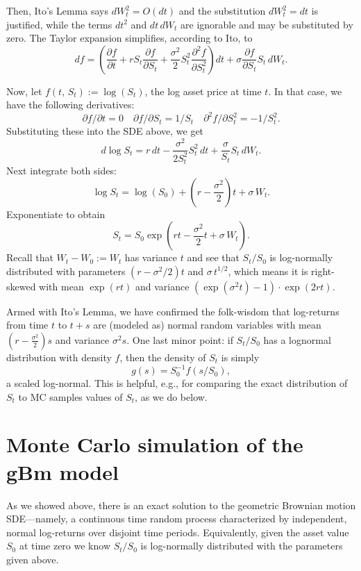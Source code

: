 \documentclass[
]{book}
\begin{document}
Then, Ito's Lemma says \(dW_t^2 = O(dt)\) and the substitution \(dW_t^2 = dt\) is justified, while the terms \(dt^2\) and \(dt\,dW_t\) are ignorable and may be substituted by zero. The Taylor expansion simplifies, according to Ito, to
\[df = \left(\frac{\partial f}{\partial t} + r S_t\frac{\partial f}{\partial S_t} +\frac{\sigma^2}{2}S_t^2\frac{\partial^2 f}{\partial S_t^2}\right)dt + \sigma\frac{\partial f}{\partial S_t}S_t \,dW_t.\]

Now, let \(f(t,\, S_t):= \log(S_t)\), the log asset price at time \(t\). In that case, we have the following derivatives:
\[\partial f/\partial t = 0\quad \partial f/\partial S_t = 1/S_t \quad \partial^2 f/\partial S_t^2 = -1/S_t^2.\]
Substituting these into the SDE above, we get
\[d\log S_t = r\,dt - \frac{\sigma^2}{2S_t^2}S_t^2\,dt + \frac{\sigma}{S_t}S_t\,dW_t. \]
Next integrate both sides:
\[\log S_t = \log(S_0) + \left(r - \frac{\sigma^2}{2}\right)t + \sigma\, W_t.\]
Exponentiate to obtain\\
\[S_t = S_0\exp\left(rt - \frac{\sigma^2}{2}t+\sigma \, W_t\right).\]
Recall that \(W_t - W_0 := W_t\) has variance \(t\) and see that \(S_t/S_0\) is log-normally distributed with parameters \((r - \sigma^2/2)t\) and \(\sigma\, t^{1/2}\), which means it is right-skewed with mean \(\exp(rt)\) and variance \((\exp(\sigma^2 t)-1)\cdot\exp(2rt)\).

Armed with Ito's Lemma, we have confirmed the folk-wisdom that log-returns from time \(t\) to \(t+s\) are (modeled as) normal random variables with mean \((r - \frac{\sigma^2}{2}) s\) and variance \(\sigma^2 s\). One last minor point: if \(S_t/S_0\) has a lognormal distribution with density \(f\), then the density of \(S_t\) is simply
\[g(s) = S_0^{-1}f(s/S_0),\]
a scaled log-normal. This is helpful, e.g., for comparing the exact distribution of \(S_t\) to MC samples values of \(S_t\), as we do below.

\hypertarget{monte-carlo-simulation-of-the-gbm-model}{%
\section{Monte Carlo simulation of the gBm model}\label{monte-carlo-simulation-of-the-gbm-model}}

As we showed above, there is an exact solution to the geometric Brownian motion SDE---namely, a continuous time random process characterized by independent, normal log-returns over disjoint time periods. Equivalently, given the asset value \(S_0\) at time zero we know \(S_t/S_0\) is log-normally distributed with the parameters given above.
\end{document}
